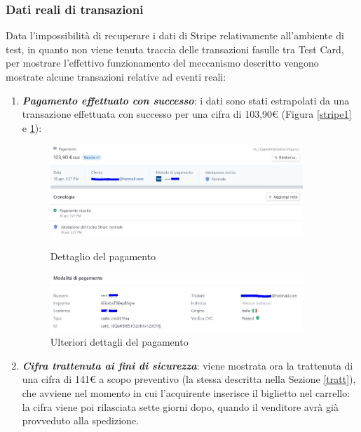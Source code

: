 \subsubsection{Dati reali di transazioni}
Data l'impossibilità di recuperare i dati di Stripe relativamente all'ambiente di test, in quanto non viene tenuta traccia delle transazioni fasulle tra Test Card, per mostrare l'effettivo funzionamento del meccanismo descritto vengono mostrate alcune transazioni relative ad eventi reali: 
\begin{enumerate}
\item \textbf{\textit{Pagamento effettuato con successo}}: i dati sono stati estrapolati da una transazione effettuata con successo per una cifra di 103,90€ (Figura \ref{stripe1} e \ref{stripe2}):  
\begin{figure}[htbp]
    \centering
    \begin{minipage}{0.45\textwidth}
        \centering
        \includegraphics[width=0.9\textwidth]{chapter4/immagini/es_stripe} %
        \caption{Dettaglio del pagamento}
				\label{stripe1}
    \end{minipage}\hfill
    \begin{minipage}{0.45\textwidth}
        \centering
        \includegraphics[width=0.9\textwidth]{chapter4/immagini/es_stripe_2} %
        \caption{Ulteriori dettagli del pagamento}
				\label{stripe2}
    \end{minipage}
\end{figure}
\item \textbf{\textit{Cifra trattenuta ai fini di sicurezza}}: viene mostrata ora la trattenuta di una cifra di 141€ a scopo preventivo (la stessa descritta nella Sezione \ref{tratt}), che avviene nel momento in cui l'acquirente inserisce il biglietto nel carrello: la cifra viene poi rilasciata sette giorni dopo, quando il venditore avrà già provveduto alla spedizione. 

\end{enumerate}
